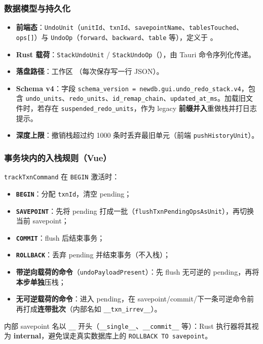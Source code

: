 \subsubsection{数据模型与持久化}

\begin{itemize}
  \item \textbf{前端态}：\texttt{UndoUnit}（\texttt{unitId}、\texttt{txnId}、\texttt{savepointName}、\texttt{tablesTouched}、\texttt{ops[]}）与 \texttt{UndoOp}（\texttt{forward}、\texttt{backward}、\texttt{table} 等），定义于 。
  \item \textbf{Rust 载荷}：\texttt{StackUndoUnit} / \texttt{StackUndoOp}（），由 Tauri 命令序列化传递。
  \item \textbf{落盘路径}：工作区 （每次保存写一行 JSON）。
  \item \textbf{Schema v4}：字段 \texttt{schema\_version = newdb.gui.undo\_redo\_stack.v4}，包含 \texttt{undo\_units}、\texttt{redo\_units}、\texttt{id\_remap\_chain}、\texttt{updated\_at\_ms}。加载旧文件时，若存在 \texttt{suspended\_redo\_units}，作为 legacy \textbf{前缀并入}重做栈并打日志提示。
  \item \textbf{深度上限}：撤销栈超过约 1000 条时丢弃最旧单元（前端 \texttt{pushHistoryUnit}）。
\end{itemize}

\subsubsection{事务块内的入栈规则（Vue）}

\texttt{trackTxnCommand} 在 \texttt{BEGIN} 激活时：
\begin{itemize}
  \item \textbf{\texttt{BEGIN}}：分配 \texttt{txnId}，清空 pending；
  \item \textbf{\texttt{SAVEPOINT}}：先将 pending 打成一批（\texttt{flushTxnPendingOpsAsUnit}），再切换当前 savepoint；
  \item \textbf{\texttt{COMMIT}}：flush 后结束事务；
  \item \textbf{\texttt{ROLLBACK}}：丢弃 pending 并结束事务（不入栈）；
  \item \textbf{带逆向载荷的命令}（\texttt{undoPayloadPresent}）：先 flush 无可逆的 pending，再将\textbf{本步单独}压栈；
  \item \textbf{无可逆载荷的命令}：进入 pending，在 savepoint/commit/下一条可逆命令前再打成\textbf{连带批次}（内部名如 \texttt{\_\_txn\_irrev\_\_}）。
\end{itemize}
内部 savepoint 名以 \texttt{\_\_} 开头（\texttt{\_\_single\_\_}、\texttt{\_\_commit\_\_} 等）：Rust 执行器将其视为 \textbf{internal}，避免误走真实数据库上的 \texttt{ROLLBACK TO savepoint}。


